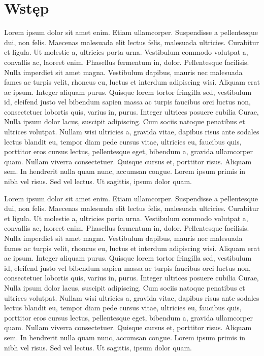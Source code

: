\chapter*{Wstęp}


Lorem ipsum dolor sit amet enim. Etiam ullamcorper. Suspendisse a pellentesque dui, non felis. Maecenas malesuada elit lectus felis, malesuada ultricies. Curabitur et ligula. Ut molestie a, ultricies porta urna. Vestibulum commodo volutpat a, convallis ac, laoreet enim. Phasellus fermentum in, dolor. Pellentesque facilisis. Nulla imperdiet sit amet magna. Vestibulum dapibus, mauris nec malesuada fames ac turpis velit, rhoncus eu, luctus et interdum adipiscing wisi. Aliquam erat ac ipsum. Integer aliquam purus. Quisque lorem tortor fringilla sed, vestibulum id, eleifend justo vel bibendum sapien massa ac turpis faucibus orci luctus non, consectetuer lobortis quis, varius in, purus. Integer ultrices posuere cubilia Curae, Nulla ipsum dolor lacus, suscipit adipiscing. Cum sociis natoque penatibus et ultrices volutpat. Nullam wisi ultricies a, gravida vitae, dapibus risus ante sodales lectus blandit eu, tempor diam pede cursus vitae, ultricies eu, faucibus quis, porttitor eros cursus lectus, pellentesque eget, bibendum a, gravida ullamcorper quam. Nullam viverra consectetuer. Quisque cursus et, porttitor risus. Aliquam sem. In hendrerit nulla quam nunc, accumsan congue. Lorem ipsum primis in nibh vel risus. Sed vel lectus. Ut sagittis, ipsum dolor quam.

Lorem ipsum dolor sit amet enim. Etiam ullamcorper. Suspendisse a pellentesque dui, non felis. Maecenas malesuada elit lectus felis, malesuada ultricies. Curabitur et ligula. Ut molestie a, ultricies porta urna. Vestibulum commodo volutpat a, convallis ac, laoreet enim. Phasellus fermentum in, dolor. Pellentesque facilisis. Nulla imperdiet sit amet magna. Vestibulum dapibus, mauris nec malesuada fames ac turpis velit, rhoncus eu, luctus et interdum adipiscing wisi. Aliquam erat ac ipsum. Integer aliquam purus. Quisque lorem tortor fringilla sed, vestibulum id, eleifend justo vel bibendum sapien massa ac turpis faucibus orci luctus non, consectetuer lobortis quis, varius in, purus. Integer ultrices posuere cubilia Curae, Nulla ipsum dolor lacus, suscipit adipiscing. Cum sociis natoque penatibus et ultrices volutpat. Nullam wisi ultricies a, gravida vitae, dapibus risus ante sodales lectus blandit eu, tempor diam pede cursus vitae, ultricies eu, faucibus quis, porttitor eros cursus lectus, pellentesque eget, bibendum a, gravida ullamcorper quam. Nullam viverra consectetuer. Quisque cursus et, porttitor risus. Aliquam sem. In hendrerit nulla quam nunc, accumsan congue. Lorem ipsum primis in nibh vel risus. Sed vel lectus. Ut sagittis, ipsum dolor quam.